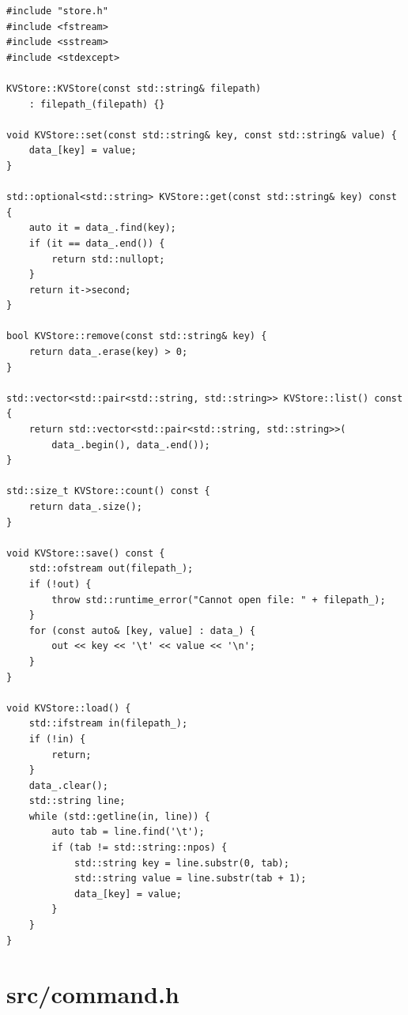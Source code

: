 \documentclass[11pt,a4paper]{book}
\newcommand{\file}[1]{\texttt{#1}}
\begin{document}
\begin{lstlisting}[style=cpp,title={\file{src/store.cpp}}]
#include "store.h"
#include <fstream>
#include <sstream>
#include <stdexcept>

KVStore::KVStore(const std::string& filepath)
    : filepath_(filepath) {}

void KVStore::set(const std::string& key, const std::string& value) {
    data_[key] = value;
}

std::optional<std::string> KVStore::get(const std::string& key) const {
    auto it = data_.find(key);
    if (it == data_.end()) {
        return std::nullopt;
    }
    return it->second;
}

bool KVStore::remove(const std::string& key) {
    return data_.erase(key) > 0;
}

std::vector<std::pair<std::string, std::string>> KVStore::list() const {
    return std::vector<std::pair<std::string, std::string>>(
        data_.begin(), data_.end());
}

std::size_t KVStore::count() const {
    return data_.size();
}

void KVStore::save() const {
    std::ofstream out(filepath_);
    if (!out) {
        throw std::runtime_error("Cannot open file: " + filepath_);
    }
    for (const auto& [key, value] : data_) {
        out << key << '\t' << value << '\n';
    }
}

void KVStore::load() {
    std::ifstream in(filepath_);
    if (!in) {
        return;
    }
    data_.clear();
    std::string line;
    while (std::getline(in, line)) {
        auto tab = line.find('\t');
        if (tab != std::string::npos) {
            std::string key = line.substr(0, tab);
            std::string value = line.substr(tab + 1);
            data_[key] = value;
        }
    }
}
\end{lstlisting}

\section{src/command.h}
\end{document}

